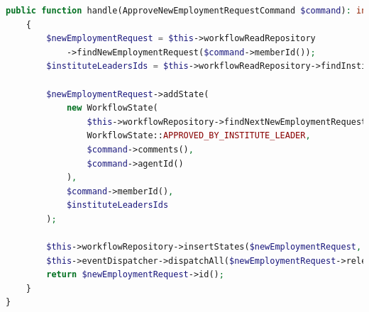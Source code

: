 \begin{lstlisting}[language=php, caption={Example of handle method to deal with the press of the approve button by the TL (Team Leader).}, basicstyle=\tiny, label=lst:handle_wf]
public function handle(ApproveNewEmploymentRequestCommand $command): int
    {
        $newEmploymentRequest = $this->workflowReadRepository
            ->findNewEmploymentRequest($command->memberId());
        $instituteLeadersIds = $this->workflowReadRepository->findInstituteLeaderIds($newEmploymentRequest->instituteId());

        $newEmploymentRequest->addState(
            new WorkflowState(
                $this->workflowRepository->findNextNewEmploymentRequestStateId(),
                WorkflowState::APPROVED_BY_INSTITUTE_LEADER,
                $command->comments(),
                $command->agentId()
            ),
            $command->memberId(),
            $instituteLeadersIds
        );

        $this->workflowRepository->insertStates($newEmploymentRequest, $command->agentId());
        $this->eventDispatcher->dispatchAll($newEmploymentRequest->releaseEvents());
        return $newEmploymentRequest->id();
    }
}
\end{lstlisting}


